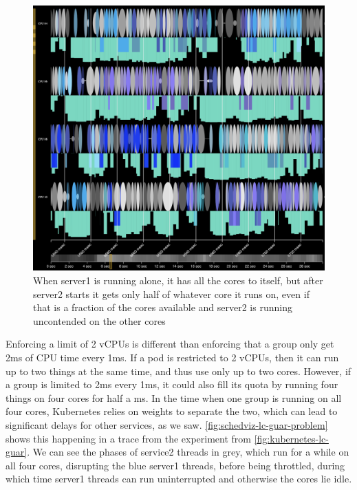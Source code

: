 \begin{figure}[t]
    \centering
    \includegraphics[width=\columnwidth]{graphs/schedviz-lc-guar-problem.png}
    \caption{When server1 is running alone, it has all the cores to itself, but
    after server2 starts it gets only half of whatever core it runs on, even if
    that is a fraction of the cores available and server2 is running uncontended
    on the other cores}\label{fig:schedviz-lc-guar-problem}
\end{figure}

Enforcing a limit of 2 vCPUs is different than enforcing that a group only get
2ms of CPU time every 1ms. If a pod is restricted to 2 vCPUs, then it can run up
to two things at the same time, and thus use only up to two cores. However, if a
group is limited to 2ms every 1ms, it could also fill its quota by running four
things on four cores for half a ms. In the time when one group is running on all
four cores, Kubernetes relies on weights to separate the two, which can lead to
significant delays for other services, as we saw.
\autoref{fig:schedviz-lc-guar-problem} shows this happening in a trace from the
experiment from \autoref{fig:kubernetes-lc-guar}. We can see the phases of
service2 threads in grey, which run for a while on all four cores, disrupting
the blue server1 threads, before being throttled, during which time server1
threads can run uninterrupted and otherwise the cores lie idle.



